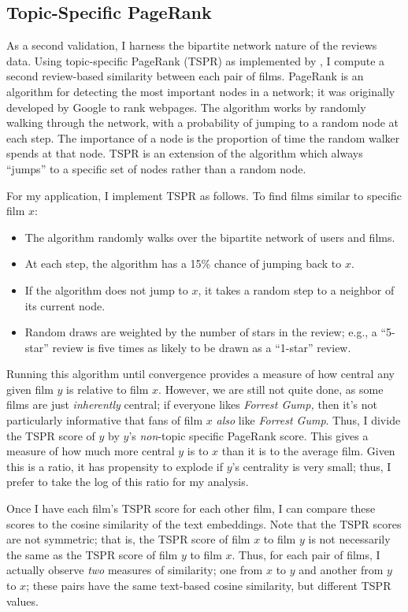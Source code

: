 \documentclass{article}
\begin{document}
\subsection{Topic-Specific PageRank}

As a second validation, I harness the bipartite network nature of the reviews data. Using topic-specific PageRank (TSPR) as implemented by \textcite{sajani2023}, I compute a second review-based similarity between each pair of films. PageRank is an algorithm for detecting the most important nodes in a network; it was originally developed by Google to rank webpages. The algorithm works by randomly walking through the network, with a probability of jumping to a random node at each step. The importance of a node is the proportion of time the random walker spends at that node. TSPR is an extension of the algorithm which always ``jumps'' to a specific set of nodes rather than a random node.

For my application, I implement TSPR as follows. To find films similar to specific film $x$:
\begin{itemize}
    \item The algorithm randomly walks over the bipartite network of users and films. 
    \item At each step, the algorithm has a 15\% chance of jumping back to $x$.
    \item If the algorithm does not jump to $x$, it takes a random step to a neighbor of its current node.
    \item Random draws are weighted by the number of stars in the review; e.g., a ``5-star'' review is five times as likely to be drawn as a ``1-star'' review.
\end{itemize}

Running this algorithm until convergence provides a measure of how central any given film $y$ is relative to film $x$. However, we are still not quite done, as some films are just \emph{inherently} central; if everyone likes \emph{Forrest Gump,} then it's not particularly informative that fans of film $x$ \emph{also} like \emph{Forrest Gump}. Thus, I divide the TSPR score of $y$ by $y$'s \emph{non}-topic specific PageRank score. This gives a measure of how much more central $y$ is to $x$ than it is to the average film. Given this is a ratio, it has propensity to explode if $y$'s centrality is very small; thus, I prefer to take the log of this ratio for my analysis.

Once I have each film's TSPR score for each other film, I can compare these scores to the cosine similarity of the text embeddings. Note that the TSPR scores are not symmetric; that is, the TSPR score of film $x$ to film $y$ is not necessarily the same as the TSPR score of film $y$ to film $x$. Thus, for each pair of films, I actually observe \emph{two} measures of similarity; one from $x$ to $y$ and another from $y$ to $x$; these pairs have the same text-based cosine similarity, but different TSPR values. 
\end{document}
